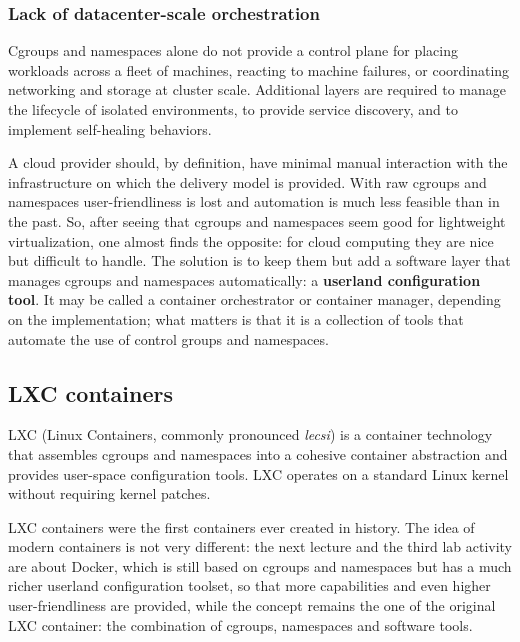 \subsubsection*{Lack of datacenter-scale orchestration}

Cgroups and namespaces alone do not provide a control plane for placing workloads across a fleet of machines, reacting to machine failures, or coordinating networking and storage at cluster scale. Additional layers are required to manage the lifecycle of isolated environments, to provide service discovery, and to implement self-healing behaviors.

A cloud provider should, by definition, have minimal manual interaction with the infrastructure on which the delivery model is provided. With raw cgroups and namespaces user-friendliness is lost and automation is much less feasible than in the past. So, after seeing that cgroups and namespaces seem good for lightweight virtualization, one almost finds the opposite: for cloud computing they are nice but difficult to handle. The solution is to keep them but add a software layer that manages cgroups and namespaces automatically: a \textbf{userland configuration tool}. It may be called a container orchestrator or container manager, depending on the implementation; what matters is that it is a collection of tools that automate the use of control groups and namespaces.

\subsection{LXC containers}

LXC (Linux Containers, commonly pronounced \emph{lecsi}) is a container technology that assembles cgroups and namespaces into a cohesive container abstraction and provides user-space configuration tools. LXC operates on a standard Linux kernel without requiring kernel patches.

LXC containers were the first containers ever created in history. The idea of modern containers is not very different: the next lecture and the third lab activity are about Docker, which is still based on cgroups and namespaces but has a much richer userland configuration toolset, so that more capabilities and even higher user-friendliness are provided, while the concept remains the one of the original LXC container: the combination of cgroups, namespaces and software tools.

